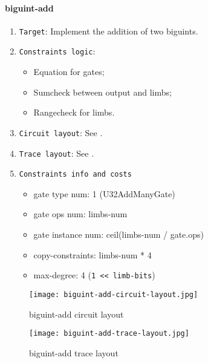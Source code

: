 \paragraph{biguint-add}

\begin{enumerate}
    \item \verb|Target|: Implement the addition of two biguints.
    \item \verb|Constraints logic|: 
        \begin{itemize}
            \item Equation for gates;
            \item Sumcheck between output and limbs;
            \item Rangecheck for limbs.
        \end{itemize}
    \item \verb|Circuit layout|: See .
    \item \verb|Trace layout|: See .
    \item \verb|Constraints info and costs|
    \begin{itemize}
        \item gate type num: 1 (U32AddManyGate)
        \item gate ops num: limbs-num
        \item gate instance num: ceil(limbs-num / gate.ops)
        \item copy-constraints: limbs-num * 4
        \item max-degree: 4 (\verb|1 << limb-bits|)
    \end{itemize}
\end{enumerate}

\begin{figure}[!ht]
    \centering
    \texttt{[image: biguint-add-circuit-layout.jpg]}
    \caption{biguint-add circuit layout}
    \label{fig:biguint-add-circuit-layout}
\end{figure}
 
\begin{figure}[!ht]
    \centering
    \texttt{[image: biguint-add-trace-layout.jpg]}
    \caption{biguint-add trace layout}
    \label{fig:biguint-add-trace-layout}
\end{figure}